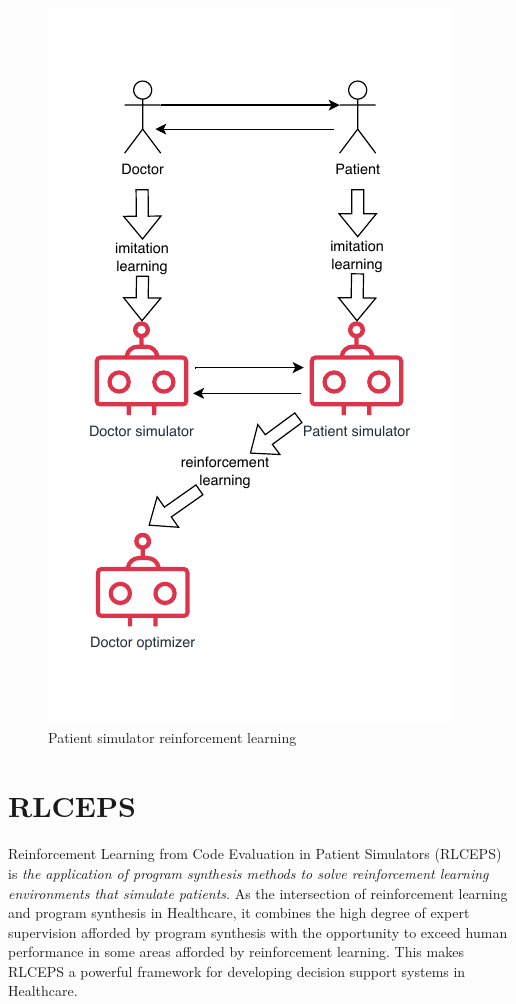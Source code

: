 \begin{figure}
  \centering
  \includegraphics[width=0.9\linewidth]{images/rlceps.pdf}
  \caption{Patient simulator reinforcement learning}
  \label{fig:RLCEPS}
\end{figure}

\newpage
\section{RLCEPS}
\label{sec:patient-sRLCEF}

\begin{highlight}
Reinforcement Learning from Code Evaluation in Patient Simulators (RLCEPS) is \emph{the application of program synthesis methods to solve reinforcement learning environments that simulate patients}.
As the intersection of reinforcement learning and program synthesis in Healthcare, it combines the high degree of expert supervision afforded by program synthesis with the opportunity to exceed human performance in some areas afforded by reinforcement learning.
This makes RLCEPS a powerful framework for developing decision support systems in Healthcare.
\end{highlight}

